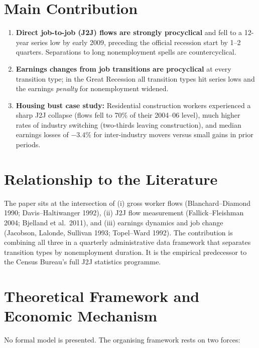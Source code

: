 \section{Main Contribution}

\begin{enumerate}
  \item \textbf{Direct job-to-job (J2J) flows are strongly procyclical} and
    fell to a 12-year series low by early 2009, preceding the official
    recession start by 1--2 quarters. Separations to long nonemployment spells
    are countercyclical.
  \item \textbf{Earnings changes from job transitions are procyclical} at
    every transition type; in the Great Recession all transition types hit
    series lows and the earnings \emph{penalty} for nonemployment widened.
  \item \textbf{Housing bust case study:} Residential construction workers
    experienced a sharp J2J collapse (flows fell to 70\% of their
    2004--06 level), much higher rates of industry switching (two-thirds
    leaving construction), and median earnings losses of $-3.4\%$ for
    inter-industry movers versus small gains in prior periods.
\end{enumerate}

\section{Relationship to the Literature}

The paper sits at the intersection of (i) gross worker flows
(Blanchard--Diamond 1990; Davis--Haltiwanger 1992), (ii) J2J flow measurement
(Fallick--Fleishman 2004; Bjelland et al.\ 2011), and (iii) earnings dynamics
and job change (Jacobson, Lalonde, Sullivan 1993; Topel--Ward 1992). The
contribution is combining all three in a quarterly administrative data
framework that separates transition types by nonemployment duration.
It is the empirical predecessor to the Census Bureau's full J2J statistics
programme.

\section{Theoretical Framework and Economic Mechanism}

No formal model is presented. The organising framework rests on two forces:

